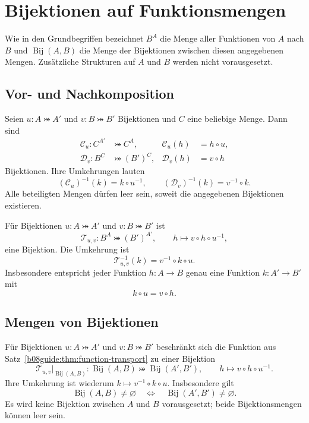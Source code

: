 \chapter{Bijektionen auf Funktionsmengen}
\label{b08guide:ch:functionsets}

Wie in den Grundbegriffen bezeichnet $B^A$ die Menge aller
Funktionen von $A$ nach $B$ und $\operatorname{Bij}(A,B)$ die
Menge der Bijektionen zwischen diesen angegebenen Mengen.
Zusätzliche Strukturen auf $A$ und $B$ werden nicht vorausgesetzt.

\section{Vor- und Nachkomposition}

\begin{theorem}
\label{b08guide:thm:pre-post-composition}
Seien $u\colon A\bij A'$ und $v\colon B\bij B'$ Bijektionen
und $C$ eine beliebige Menge. Dann sind
\[
 \begin{aligned}
 \mathcal C_u\colon C^{A'}&\bij C^A,
 &\mathcal C_u(h)&=h\circ u,\\
 \mathcal D_v\colon B^C&\bij (B')^C,
 &\mathcal D_v(h)&=v\circ h
 \end{aligned}
\]
Bijektionen. Ihre Umkehrungen lauten
\[
 (\mathcal C_u)^{-1}(k)=k\circ u^{-1},
 \qquad (\mathcal D_v)^{-1}(k)=v^{-1}\circ k.
\]
Alle beteiligten Mengen dürfen leer sein, soweit die angegebenen
Bijektionen existieren.
\end{theorem}

\begin{theorem}
\label{b08guide:thm:function-transport}
Für Bijektionen $u\colon A\bij A'$ und $v\colon B\bij B'$ ist
\[
 \mathcal T_{u,v}\colon B^A\bij (B')^{A'},
 \qquad h\mapsto v\circ h\circ u^{-1},
\]
eine Bijektion. Die Umkehrung ist
\[
 \mathcal T_{u,v}^{-1}(k)=v^{-1}\circ k\circ u.
\]
Insbesondere entspricht jeder Funktion $h\colon A\to B$
genau eine Funktion $k\colon A'\to B'$ mit
\[
 k\circ u=v\circ h.
\]
\end{theorem}

\section{Mengen von Bijektionen}

\begin{theorem}
\label{b08guide:thm:bijection-transport}
Für Bijektionen $u\colon A\bij A'$ und $v\colon B\bij B'$
beschränkt sich die Funktion aus
Satz~\ref{b08guide:thm:function-transport} zu einer Bijektion
\[
 \mathcal T_{u,v}\big|_{\operatorname{Bij}(A,B)}
 \colon\operatorname{Bij}(A,B)\bij\operatorname{Bij}(A',B'),
 \qquad h\mapsto v\circ h\circ u^{-1}.
\]
Ihre Umkehrung ist wiederum $k\mapsto v^{-1}\circ k\circ u$.
Insbesondere gilt
\[
 \operatorname{Bij}(A,B)\ne\varnothing
 \quad\Longleftrightarrow\quad
 \operatorname{Bij}(A',B')\ne\varnothing.
\]
Es wird keine Bijektion zwischen $A$ und $B$ vorausgesetzt;
beide Bijektionsmengen können leer sein.
\end{theorem}

